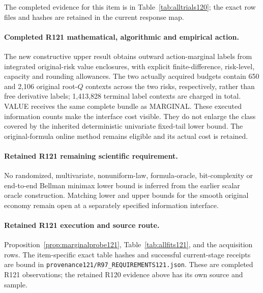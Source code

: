 The completed evidence for this item is in Table~\ref{tab:alltrials120}; the exact row files and hashes are retained in the current response map.

\paragraph{Completed R121 mathematical, algorithmic and empirical action.}
The new constructive upper result obtains outward action-marginal labels from integrated original-risk value enclosures, with explicit finite-difference, risk-level, capacity and rounding allowances. The two actually acquired budgets contain 650 and 2,106 original root-$Q$ contexts across the two risks, respectively, rather than free derivative labels; 1,413,828 terminal label contexts are charged in total. VALUE receives the same complete bundle as MARGINAL. These executed information counts make the interface cost visible. They do not enlarge the class covered by the inherited deterministic univariate fixed-tail lower bound. The original-formula online method remains eligible and its actual cost is retained.

\paragraph{Retained R121 remaining scientific requirement.}
No randomized, multivariate, nonuniform-law, formula-oracle, bit-complexity or end-to-end Bellman minimax lower bound is inferred from the earlier scalar oracle construction. Matching lower and upper bounds for the smooth original economy remain open at a separately specified information interface.

\paragraph{Retained R121 execution and source route.}
Proposition~\ref{prop:marginalprobe121}, Table~\ref{tab:allfits121}, and the acquisition rows.
The item-specific exact table hashes and successful current-stage receipts are bound in \nolinkurl{provenance121/R97_REQUIREMENTS121.json}. These are completed R121 observations; the retained R120 evidence above has its own source and sample.

